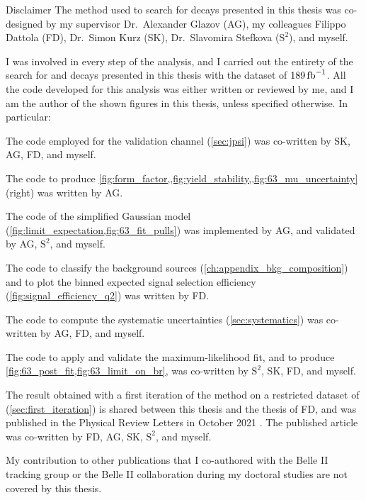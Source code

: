 \begin{abstractpage}{Disclaimer}
The method used to search for \BKnn decays presented in this thesis was co-designed by my supervisor Dr.~Alexander Glazov (AG), my colleagues Filippo Dattola (FD), Dr.~Simon Kurz (SK), Dr.~Slavomira Stefkova ($\mathrm{S^2}$), and myself.

I was involved in every step of the analysis, and I carried out the entirety of the search for \BKpnn and \BKznn decays presented in this thesis with the dataset of $189\mbox{\,fb}^{-1}$.
All the code developed for this analysis was either written or reviewed by me, and I am the author of the shown figures in this thesis, unless specified otherwise. In particular:
\bi
\item The code employed for the validation channel (\cref{sec:jpsi}) was co-written by SK, AG, FD, and myself.
\item The code to produce \cref{fig:form_factor,,fig:yield_stability,,fig:63_mu_uncertainty} (right) was written by AG.
\item The code of the simplified Gaussian model (\cref{fig:limit_expectation,fig:63_fit_pulls}) was implemented by AG, and validated by AG, $\mathrm{S^2}$, and myself.
\item The code to classify the background sources (\cref{ch:appendix_bkg_composition}) and to plot the binned expected signal selection efficiency (\cref{fig:signal_efficiency_q2}) was written by FD.
\item The code to compute the systematic uncertainties (\cref{sec:systematics}) was co-written by AG, FD, and myself.
\item The code to apply and validate the maximum-likelihood fit, and to produce \cref{fig:63_post_fit,fig:63_limit_on_br}, was co-written by $\mathrm{S^2}$, SK, FD, and myself.
\ei

The result obtained with a first iteration of the method on a restricted dataset of \lumionpartial (\cref{sec:first_iteration}) is shared between this thesis and the thesis of FD, and was published in the Physical Review Letters in October 2021 \cite{Belle-II:2021rof}.
The published article was co-written by FD, AG, SK, $\mathrm{S^2}$, and myself.

My contribution to other publications that I co-authored with the Belle II tracking group \cite{Bertacchi2021} or the Belle II collaboration \cite{Belle-II:2019usr,Belle-II:2019qfb,Belle-II:2020jti,Belle-II:2021cxx,Belle:2021efh} during my doctoral studies are not covered by this thesis.

\end{abstractpage}

